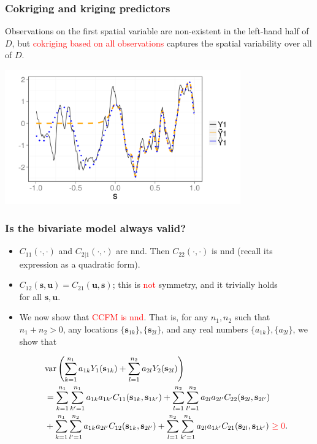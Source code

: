 \documentclass{beamer}
\newcommand{\svec} {\textbf{s}}
\newcommand{\uvec} {\textbf{u}}
\newcommand{\s}{\mathbf{s}}
\renewcommand{\u}{\mathbf{u}}
\newcommand{\var}{\mathrm{var}}
\begin{document}
\begin{frame}
\frametitle{Cokriging and kriging predictors}
Observations on the first spatial variable are non-existent in the left-hand half of $D$, but \textcolor{red}{cokriging based on all observations} captures the spatial variability over all of $D$.
\vspace{-.5cm}
\begin{center}
\includegraphics[width=4in]{./sim_est.png}
\end{center}
\end{frame}


\begin{frame}
\frametitle{Is the bivariate model always valid?}

\begin{itemize}
\item $C_{11}(\cdot,\cdot)$ and $C_{2|1}(\cdot,\cdot)$ are nnd. Then $C_{22}(\cdot,\cdot)$ is nnd (recall its expression as a quadratic form).
\item $C_{12}(\svec,\uvec) = C_{21}(\uvec,\svec)$; this is \textcolor{red}{not} symmetry, and it trivially holds \\for all $\s,\u$.
\item We now show that \textcolor{red}{CCFM is nnd}. That is, for any $n_1,n_2$ such that $n_1 + n_2 > 0$, any locations $\{\svec_{1k}\}, \{\svec_{2l}\}$, and any real numbers $\{a_{1k}\},\{a_{2l}\}$, we show that

\small
\begin{align*}
 & \var\left(\sum_{k=1}^{n_1}{a_{1k}Y_1(\s_{1k})}+\sum_{l=1}^{n_2}{a_{2l}Y_2(\s_{2l})}\right) \\ &=\sum_{k=1}^{n_1}\sum_{k'=1}^{n_1} a_{1k}a_{1k'}C_{11}(\s_{1k},\s_{1k'})+\sum_{l=1}^{n_2}\sum_{l'=1}^{n_2} a_{2l}a_{2l'}C_{22}(\s_{2l},\s_{2l'}) \\
  &+\sum_{k=1}^{n_1}\sum_{l'=1}^{n_2} a_{1k}a_{2l'}C_{12}(\s_{1k},\s_{2l'})+\sum_{l=1}^{n_2}\sum_{k'=1}^{n_1} a_{2l}a_{1k'}C_{21}(\s_{2l},\s_{1k'})~ \textcolor{red}{\ge 0}.
\end{align*}

\normalsize
\end{itemize}
\end{frame}
\end{document}
